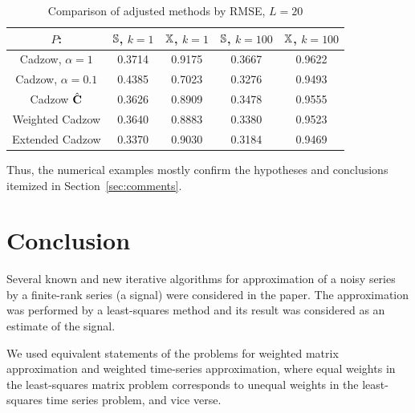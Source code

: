 \documentclass[sii]{ipart}
\begin{document}
\begin{table}
	\begin{center}
		\caption{Comparison of adjusted methods by RMSE, $L = 20$}\label{fintable_improved}
		\begin{tabular*}{\textwidth}{@{\extracolsep{\fill}}ccccc}
			\hline
			$P$: & $\mathbb{S}$, $k = 1$ & $\mathbb{X}$, $k = 1$ & $\mathbb{S}$, $k = 100$ & $\mathbb{X}$, $k = 100$  \\
			\hline
			Cadzow, $\alpha = 1$ & 0.3714 & 0.9175 & 0.3667 & 0.9622 \\
			\hline
			Cadzow, $\alpha = 0.1$ & 0.4385 & 0.7023 & 0.3276 & 0.9493 \\
			\hline
			Cadzow $\hat{\mathbf{C}}$ & 0.3626 & 0.8909 & 0.3478 & 0.9555 \\
			\hline
			Weighted Cadzow & 0.3640 & 0.8883 & 0.3380 & 0.9523 \\
			\hline
			Extended Cadzow & 0.3370 & 0.9030 & 0.3184 & 0.9469 \\
			\hline
		\end{tabular*}
	\end{center}
\end{table}

Thus, the numerical examples mostly confirm the hypotheses and conclusions itemized in Section~\ref{sec:comments}.

\section{Conclusion}
\label{sec:concl}
%
%

Several known and new iterative algorithms for approximation of a noisy series by a finite-rank series (a signal) were considered in the paper. The approximation was performed by a least-squares method and its result was considered as an estimate of the signal.

 We used equivalent statements of the problems for weighted matrix approximation and  weighted time-series approximation, where equal weights in the least-squares matrix problem corresponds
 to unequal weights in the least-squares time series problem, and vice verse.
\end{document}
